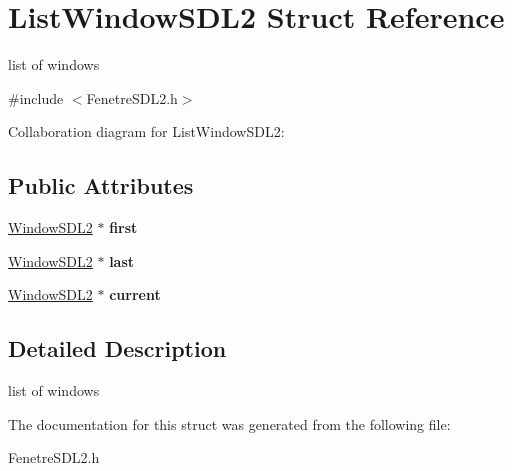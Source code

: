 \hypertarget{structListWindowSDL2}{}\section{List\+Window\+S\+D\+L2 Struct Reference}
\label{structListWindowSDL2}


list of windows  




{\ttfamily \#include $<$Fenetre\+S\+D\+L2.\+h$>$}



Collaboration diagram for List\+Window\+S\+D\+L2\+:
\subsection*{Public Attributes}
\begin{DoxyCompactItemize}
\item 
\hyperlink{structWindowSDL2}{Window\+S\+D\+L2} $\ast$ {\bfseries first}\hypertarget{structListWindowSDL2_aa97229f3f9f48a602b2a96bfc1bb2bf9}{}\label{structListWindowSDL2_aa97229f3f9f48a602b2a96bfc1bb2bf9}

\item 
\hyperlink{structWindowSDL2}{Window\+S\+D\+L2} $\ast$ {\bfseries last}\hypertarget{structListWindowSDL2_ae71123501af1a866d08d4eab4b026b41}{}\label{structListWindowSDL2_ae71123501af1a866d08d4eab4b026b41}

\item 
\hyperlink{structWindowSDL2}{Window\+S\+D\+L2} $\ast$ {\bfseries current}\hypertarget{structListWindowSDL2_a221c8512f5669c9ec3f5450b139a3493}{}\label{structListWindowSDL2_a221c8512f5669c9ec3f5450b139a3493}

\end{DoxyCompactItemize}


\subsection{Detailed Description}
list of windows 

The documentation for this struct was generated from the following file\+:\begin{DoxyCompactItemize}
\item 
Fenetre\+S\+D\+L2.\+h\end{DoxyCompactItemize}
